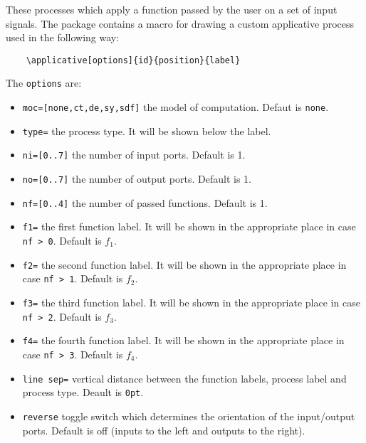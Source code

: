 \documentclass[10pt]{article}
\begin{document}
These processes which apply a function passed by the user on a set of input signals. The package contains a macro for drawing a custom applicative process used in the following way:

\begin{verbatim}
	\applicative[options]{id}{position}{label}
\end{verbatim}

The \texttt{options} are:
\begin{itemize}
\item \texttt{moc=[none,ct,de,sy,sdf]} the model of computation. Defaut is \texttt{none}.
\item \texttt{type=} the process type. It will be shown below the label.
\item \texttt{ni=[0..7]} the number of input ports. Default is 1.
\item \texttt{no=[0..7]} the number of output ports. Default is 1.
\item \texttt{nf=[0..4]} the number of passed functions. Default is 1.
\item \texttt{f1=} the first function label. It will be shown in the appropriate place in case \texttt{nf > 0}. Default is $f_1$.
\item \texttt{f2=} the second function label. It will be shown in the appropriate place in case \texttt{nf > 1}. Default is $f_2$.
\item \texttt{f3=} the third function label. It will be shown in the appropriate place in case \texttt{nf > 2}. Default is $f_3$.
\item \texttt{f4=} the fourth function label. It will be shown in the appropriate place in case \texttt{nf > 3}. Default is $f_4$.
\item\texttt{line sep=} vertical distance between the function labels, process label and process type. Deault is \texttt{0pt}.
\item\texttt{reverse} toggle switch which determines the orientation of the input/output ports. Default is off (inputs to the left and outputs to the right).

\end{itemize}
\end{document}
